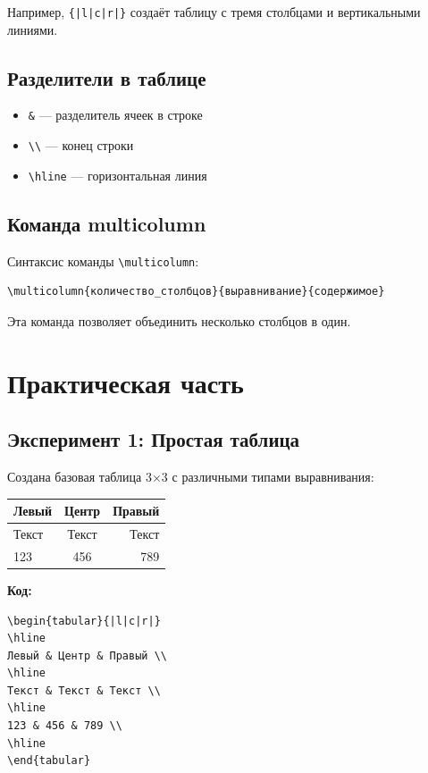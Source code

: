 \documentclass[12pt,a4paper]{article}
\begin{document}
Например, \texttt{\{|l|c|r|\}} создаёт таблицу с тремя столбцами и вертикальными линиями.

\subsection{Разделители в таблице}

\begin{itemize}
    \item \texttt{\&} — разделитель ячеек в строке
    \item \texttt{\textbackslash\textbackslash} — конец строки
    \item \texttt{\textbackslash hline} — горизонтальная линия
\end{itemize}

\subsection{Команда multicolumn}

Синтаксис команды \texttt{\textbackslash multicolumn}:

\begin{verbatim}
\multicolumn{количество_столбцов}{выравнивание}{содержимое}
\end{verbatim}

Эта команда позволяет объединить несколько столбцов в один.

\section{Практическая часть}

\subsection{Эксперимент 1: Простая таблица}

Создана базовая таблица 3×3 с различными типами выравнивания:

\begin{center}
\begin{tabular}{|l|c|r|}
\hline
Левый & Центр & Правый \\
\hline
Текст & Текст & Текст \\
\hline
123 & 456 & 789 \\
\hline
\end{tabular}
\end{center}

\textbf{Код:}
\begin{verbatim}
\begin{tabular}{|l|c|r|}
\hline
Левый & Центр & Правый \\
\hline
Текст & Текст & Текст \\
\hline
123 & 456 & 789 \\
\hline
\end{tabular}
\end{verbatim}
\end{document}
